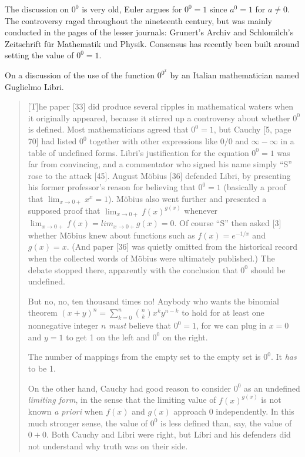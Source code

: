 The discussion on $0^0$ is very old, Euler argues for $0^0=1$ since
$a^0=1$ for $a \neq 0$. The controversy raged throughout the nineteenth
century, but was mainly conducted in the pages of the lesser journals:
Grunert's Archiv and Schlomilch's Zeitschrift f\"ur Mathematik und
Physik. Consensus has recently been built around setting the value of
$0^0=1$.

On a discussion of the use of the function $0^{0^x}$ by an Italian
mathematician named Guglielmo Libri.

\begin{quote}
  [T]he paper [33] did produce several ripples in mathematical waters
  when it originally appeared, because it stirred up a controversy about
  whether $0^0$ is defined.  Most mathematicians agreed that $0^0 = 1$,
  but Cauchy [5, page 70] had listed $0^0$ together with other
  expressions like $0/0$ and $\infty-\infty$ in a table of undefined
  forms.  Libri's justification for the equation $0^0 = 1$ was far from
  convincing, and a commentator who signed his name simply ``S'' rose to
  the attack [45].  August M\"obius [36] defended Libri, by presenting
  his former professor's reason for believing that $0^0 = 1$ (basically
  a proof that $\lim_{x\rightarrow 0+} x^x = 1$).  M\"obius also went
  further and presented a supposed proof that $\lim_{x\rightarrow 0+}
  f(x)^{g(x)}$ whenever $\lim_{x\rightarrow 0+} f(x) = lim_{x\rightarrow
    0+} g(x) = 0$.  Of course ``S'' then asked [3] whether M\"obius knew
  about functions such as $f(x) = e^{-1/x}$ and $g(x) = x$.  (And paper
  [36] was quietly omitted from the historical record when the collected
  words of M\"obius were ultimately published.)  The debate stopped
  there, apparently with the conclusion that $0^0$ should be undefined.

  But no, no, ten thousand times no!  Anybody who wants the binomial
  theorem $ (x+y)^n = \sum_{k=0}^n {n\choose k} x^k y^{n-k}$ to hold for
  at least one nonnegative integer $n$ {\it must} believe that $0^0 =
  1$, for we can plug in $x = 0$ and $y = 1$ to get 1 on the left and
  $0^0$ on the right.

  The number of mappings from the empty set to the empty set is $0^0$.
  It {\it has} to be 1.

  On the other hand, Cauchy had good reason to consider $0^0$ as an
  undefined {\it limiting form}, in the sense that the limiting value of
  $f(x)^{g(x)}$ is not known {\it a priori} when $f(x)$ and $g(x)$
  approach 0 independently.  In this much stronger sense, the value of
  $0^0$ is less defined than, say, the value of $0+0$.  Both Cauchy and
  Libri were right, but Libri and his defenders did not understand why
  truth was on their side.


\end{quote}
